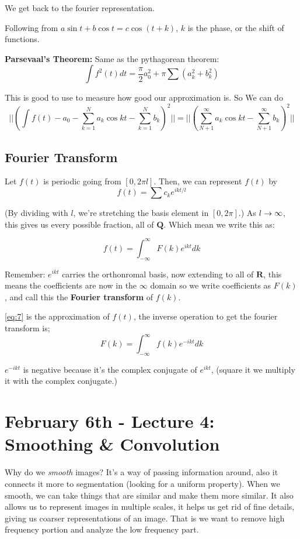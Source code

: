 We get back to the fourier representation.

Following from $a \sin t + b \cos t = c \cos (t + k)$, $k$ is the phase, or the shift
of functions.

\textbf{Parsevaal's Theorem:} Same as the pythagorean theorem:
$$\int f^2(t) dt = \frac{\pi}{2}a_0^2 + \pi\sum (a_k^2 + b_k^2)$$

This is good to use to measure how good our approximation is. 
So  
We can do $$
||(\int f(t) - a_0 -\sum_{k=1}^N a_k \cos kt - \sum_{k=1}^N
b_k)^2||  = ||(\sum_{N+1}^\infty a_k \cos kt - \sum_{N+1}^\infty b_k )^2||$$


\subsection{Fourier Transform}
\label{sec:fourier-transform-1}
Let $f(t)$ is periodic going from $[0, 2\pi l]$. Then, we can
represent $f(t)$ by
$$
  f(t)= \sum c_k e^{ikt/ l}
$$

(By dividing with $l$, we're stretching the basis element in $[0,
2\pi]$.) As $l\rightarrow \infty$, this gives us every possible fraction,
all of $\mathbf{Q}$. Which mean we write this as:

\begin{equation}
  \label{eq:7}
  f(t)= \int_{-\infty}^\infty F(k)e^{ikt}dk
\end{equation}

Remember: $e^{ikt}$ carries the orthonromal basis, now extending to
all of $\mathbf{R}$, this means the coefficients are now in the
$\infty$ domain so we write coefficients as $F(k)$, and call this the
\textbf{Fourier transform} of $f(k)$.

\eqref{eq:7} is the approximation of $f(t)$, the inverse operation to get
the fourier transform is;
\begin{equation}
  \label{eq:9}
F(k) = \int_{-\infty}^\infty f(k)e^{-ikt}dk  
\end{equation}

$e^{-ikt}$ is negative because it's the complex conjugate of
$e^{ikt}$, (square it we multiply
it with the complex conjugate.)
\pagebreak
\section{February 6th - Lecture 4: Smoothing \& Convolution}
\label{sec:lecture-4}

Why do we \emph{smooth} images? It's a way of passing information around, also it
connects it more to segmentation (looking for a uniform
property). When we smooth, we can take things that are similar and
make them more similar. It also allows us to represent images in
multiple scales, it helps us get rid of fine details, giving us coarser
representations of an image. That is we want to remove high frequency portion and
analyze the low frequency part. 

